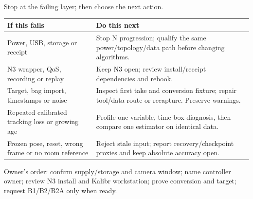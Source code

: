 \begin{frame}{Stop at the failing layer; then choose the next action.}
\small\renewcommand{\arraystretch}{1.2}
\begin{tabular}{@{}L{65mm}L{119mm}@{}}\toprule
\textbf{If this fails} & \textbf{Do this next}\\\midrule
Power, USB, storage or receipt & Stop N progression; qualify the same power/topology/data path before changing algorithms.\\
N3 wrapper, QoS, recording or replay & Keep N3 open; review install/receipt dependencies and rebook.\\
Target, bag import, timestamps or noise & Inspect first take and conversion fixture; repair tool/data route or recapture. Preserve warnings.\\
Repeated calibrated tracking loss or growing age & Profile one variable, time-box diagnosis, then compare one estimator on identical data.\\
Frozen pose, reset, wrong frame or no room reference & Reject stale input; report recovery/checkpoint proxies and keep absolute accuracy open.\\\bottomrule
\end{tabular}
\par\medskip\normalsize Owner's order: confirm supply/storage and camera window; name controller owner; review N3 install and Kalibr workstation; prove conversion and target; request B1/B2/B2A only when ready.
\vfill{}
\end{frame}

